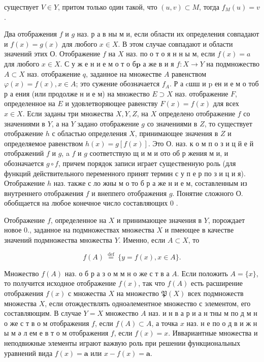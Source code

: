 \documentclass[10pt]{article}
\begin{document}
существует $V \in Y$, притом только один такой, что $(u, v) \subset M$, тогда $f_{M}(u)=v$.

Два отображения $f$ и $g$ наз. р а в ны м и, если области их определения совпадают и $f(x)=g(x)$ для любого $x \in X$. В этом случае совпадают и области значений этих О. Отображение $f$ на $X$ наз. по о т о я н н ы м, если $f(x)=a$ для любого $x \in X$. С у ж е н и е м о т о б$\mathbf{p}$ а же в и я $f: X \rightarrow Y$ на подмножество $A \subset X$ наз. отображение $q$, заданное на множестве $A$ равенством $\varphi(x)=f(x), x \in A$; это сужение обозначается $f_{A}$. Р а cшш и $\mathrm{p}$ ен и е м о тоб р а ения (или продолже н и е м) на множество $E \supset X$ наз. отображение $F$, определенное на $E$ и удовлетворяющее равенству $F(x)=f(x)$ для всех $x \in X$. Если заданы три множества $X, Y, Z$, на $X$ определено отображение $f$ со значениями в $Y$, а на $Y$ задано отображение $g$ со значениями в $Z$, то существует отображение $h$ с областью определения $X$, принимающее значения в $Z$ и определяемое равенством $h(x)=g[f(x)]$. Это О. наз. к о м п о з и ц й $е$ й отображений $f$ и $g$, a $f$ и $g$ соответствую щ и м и ото об р жения м и, и обозначается $g \circ f$, причем порядок записи играет существенную роль (для функций действительного переменного принят термин с у п е р по з и ц и я). Отображение $h$ наз. также с ло жны м о то б р а же н и е м, составленным из внутреннего отображения $f$ и внеппего отображения $g$. Понятие сложного О. обобщается на любое конечное число составляющих 0 .

Отображение $f$, определенное на $X$ и принимающее значения в $Y$, порождает новое $0 .$, заданное на подмножествах множества $X$ и пмеющее в качестве значений подмножества множества $Y$. Именно, если $A \subset X$, то

\[
f(A) \stackrel{\text { def }}{=}\{y=f(x), x \in A\} .
\]

Множество $f(A)$ наз. о б р а з о м м н о же с т в а $A$. Если положить $A=\{x\}$, то получится исходное отображение $f(x)$, так что $f(A)$ есть расширение отображения $f(x)$ с множества $X$ на множество $\mathfrak{P}(X)$ всех подмножеств множества $X$, если отождествлять одноәлементное множество с элементом, его составляющим. В случае $Y=X$ множество $A$ наз. и н в а р и а н тны м по д м н о же с т в о м отображения $f$, если $f(A) \subset A$, а точка $x$ наз. н е по о д в и ж н ы м ә л ем е в т о м отображения $f$, если $f(x)=x$. Иввариантные множества и неподвижные элементы играют важвую роль при решении функциональных уравнений вида $f(x)=\boldsymbol{a}$ или $x-f(x)=\boldsymbol{a}$.
\end{document}
